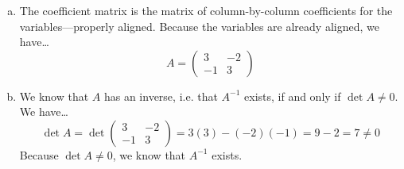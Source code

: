\documentclass[11pt,letterpaper]{article}
\begin{document}
\sol 
\begin{enumerate}[(a)]
\item The coefficient matrix is the matrix of column-by-column coefficients for the variables---properly aligned. Because the variables are already aligned, we have\dots
	\[
	A= \begin{pmatrix} 3 & -2 \\ -1 & 3 \end{pmatrix}
	\] \pspace

\item We know that $A$ has an inverse, i.e. that $A^{-1}$ exists, if and only if $\det A \neq 0$. We have\dots
	\[
	\det A= \det \begin{pmatrix} 3 & -2 \\ -1 & 3 \end{pmatrix}= 3(3) - (-2)(-1)= 9 - 2= 7 \neq 0
	\]
Because $\det A \neq 0$, we know that $A^{-1}$ exists. \pspace


\end{enumerate}
\end{document}
